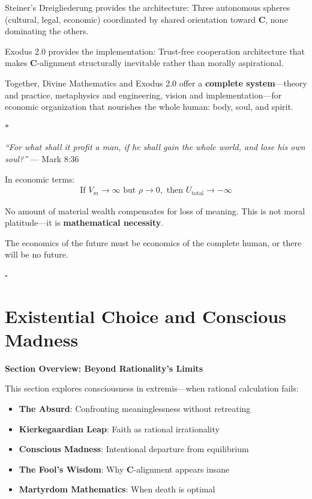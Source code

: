\documentclass[11pt,a4paper]{article}
\theoremstyle{definition}
\theoremstyle{remark}
\begin{document}
\begin{enumerate}
Steiner's Dreigliederung provides the architecture: Three autonomous spheres (cultural, legal, economic) coordinated by shared orientation toward \(\mathbf{C}\), none dominating the others.

Exodus 2.0 provides the implementation: Trust-free cooperation architecture that makes \(\mathbf{C}\)-alignment structurally inevitable rather than morally aspirational.

Together, Divine Mathematics and Exodus 2.0 offer a \textbf{complete system}—theory and practice, metaphysics and engineering, vision and implementation—for economic organization that nourishes the whole human: body, soul, and spirit.

\begin{center}
\(\ast\)
\end{center}

\textit{``For what shall it profit a man, if he shall gain the whole world, and lose his own soul?''} — Mark 8:36

In economic terms:
\begin{align}
\text{If } V_m \to \infty \text{ but } \rho \to 0, \text{ then } U_{\text{total}} \to -\infty
\end{align}

No amount of material wealth compensates for loss of meaning. This is not moral platitude—it is \textbf{mathematical necessity}.

The economics of the future must be economics of the complete human, or there will be no future.

\begin{center}
\(\square\)
\end{center}


\section{Existential Choice and Conscious Madness}

\begin{mdframed}[backgroundcolor=cyan!5,linewidth=2pt]
\textbf{Section Overview: Beyond Rationality's Limits}

This section explores consciousness in extremis—when rational calculation fails:

\begin{itemize}[nosep]
    \item \textbf{The Absurd}: Confronting meaninglessness without retreating
    \item \textbf{Kierkegaardian Leap}: Faith as rational irrationality
    \item \textbf{Conscious Madness}: Intentional departure from equilibrium
    \item \textbf{The Fool's Wisdom}: Why \(\mathbf{C}\)-alignment appears insane
    \item \textbf{Martyrdom Mathematics}: When death is optimal
\end{itemize}


\end{mdframed}
\end{enumerate}
\end{document}
